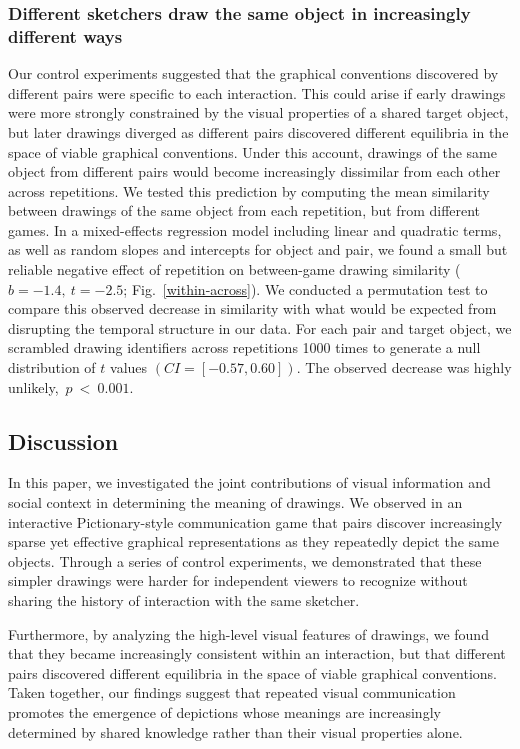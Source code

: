 \documentclass[10pt,letterpaper]{article}
\begin{document}
\subsubsection{Different sketchers draw the same object in increasingly different ways}

Our control experiments suggested that the graphical conventions discovered by different pairs were specific to each interaction. 
This could arise if early drawings were more strongly constrained by the visual properties of a shared target object, but later drawings diverged as different pairs discovered different equilibria in the space of viable graphical conventions.
Under this account, drawings of the same object from different pairs would become increasingly dissimilar from each other across repetitions. 
We tested this prediction by computing the mean similarity between drawings of the same object from each repetition, but from different games.
In a mixed-effects regression model including linear and quadratic terms, as well as random slopes and intercepts for object and pair, we found a small but reliable negative effect of repetition on between-game drawing similarity ($b = -1.4, ~t = -2.5$; Fig.~\ref{within-across}). %
We conducted a permutation test to compare this observed decrease in similarity with what would be expected from disrupting the temporal structure in our data.
For each pair and target object, we scrambled drawing identifiers across repetitions 1000 times to generate a null distribution of $t$ values $(CI = [-0.57, 0.60])$. 
The observed decrease was highly unlikely,~$p~<~0.001$. 

\subsection{Discussion}

In this paper, we investigated the joint contributions of visual information and social context in determining the meaning of drawings.
We observed in an interactive Pictionary-style communication game that pairs discover increasingly sparse yet effective graphical representations as they repeatedly depict the same objects.
Through a series of control experiments, we demonstrated that these simpler drawings were harder for independent viewers to recognize without sharing the history of interaction with the same sketcher.

Furthermore, by analyzing the high-level visual features of drawings, we found that they became increasingly consistent within an interaction, but that different pairs discovered different equilibria in the space of viable graphical conventions. 
Taken together, our findings suggest that repeated visual communication promotes the emergence of depictions whose meanings are increasingly determined by shared knowledge rather than their visual properties alone.
\end{document}
